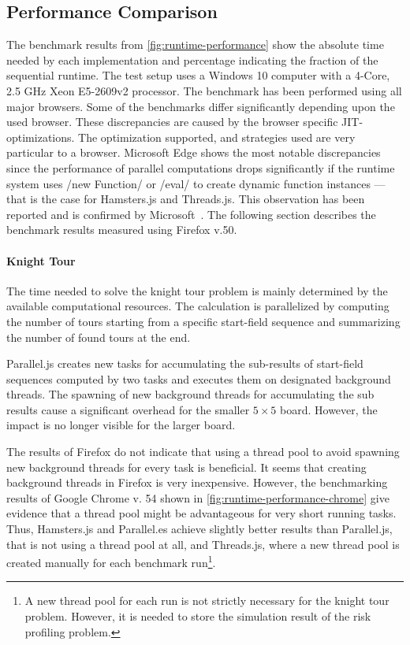 \subsection{Performance Comparison}
The benchmark results from \cref{fig:runtime-performance} show the absolute time needed by each implementation and percentage indicating the fraction of the sequential runtime. The test setup uses a Windows 10 computer with a 4-Core, 2.5 GHz Xeon E5-2609v2 processor. The benchmark has been performed using all major browsers. Some of the benchmarks differ significantly depending upon the used browser. These discrepancies are caused by the browser specific JIT-optimizations. The optimization supported, and strategies used are very particular to a browser. Microsoft Edge shows the most notable discrepancies since the performance of parallel computations drops significantly if the runtime system uses \javascriptinline/new Function/ or \javascriptinline/eval/ to create dynamic function instances --- that is the case for Hamsters.js and Threads.js. This observation has been reported and is confirmed by Microsoft~\cite{newFunctionWebWorkerEdge}. The following section describes the benchmark results measured using Firefox v.50. 

\begin{figure*}
		
	\caption{Runtime Performance of Parallelization Problems Relative to Sequential Execution}
	\label{fig:runtime-performance}
\end{figure*}


\paragraph{Knight Tour} The time needed to solve the knight tour problem is mainly determined by the available computational resources. The calculation is parallelized by computing the number of tours starting from a specific start-field sequence and summarizing the number of found tours at the end. 

Parallel.js creates new tasks for accumulating the sub-results of start-field sequences computed by two tasks and executes them on designated background threads. The spawning of new background threads for accumulating the sub results cause a significant overhead for the smaller $5\times5$ board. However, the impact is no longer visible for the larger board.

The results of Firefox do not indicate that using a thread pool to avoid spawning new background threads for every task is beneficial. It seems that creating background threads in Firefox is very inexpensive. However, the benchmarking results of Google Chrome v. 54 shown in \cref{fig:runtime-performance-chrome} give evidence that a thread pool might be advantageous for very short running tasks. Thus, Hamsters.js and Parallel.es achieve slightly better results than Parallel.js, that is not using a thread pool at all, and Threads.js, where a new thread pool is created manually for each benchmark run\footnote{A new thread pool for each run is not strictly necessary for the knight tour problem. However, it is needed to store the simulation result of the risk profiling problem.}. 

